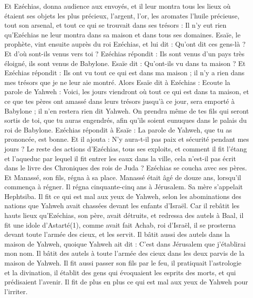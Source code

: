 \begin{multicols}{2}
Et Ezéchias, donna audience aux envoyés, et il leur montra tous les lieux où étaient ses objets les plus précieux, l’argent, l’or, les aromates l’huile précieuse, tout son arsenal, et tout ce qui se trouvait dans ses trésors : Il n’y eut rien qu’Ezéchias ne leur montra dans sa maison et dans tous ses domaines.
Esaïe, le prophète, vint ensuite auprès du roi Ezéchias, et lui dit : Qu’ont dit ces gens-là ? Et d’où sont-ils venus vers toi ? Ezéchias répondit : Ils sont venus d’un pays très éloigné, ils sont venus de Babylone.
Esaïe dit : Qu’ont-ils vu dans ta maison ? Et Ezéchias répondit : Ils ont vu tout ce qui est dans ma maison ; il n’y a rien dans mes trésors que je ne leur aie montré.
Alors Esaïe dit à Ezéchias : Ecoute la parole de Yahweh :
Voici, les jours viendront où tout ce qui est dans ta maison, et ce que tes pères ont amassé dans leurs trésors jusqu’à ce jour, sera emporté à Babylone ; il n’en restera rien dit Yahweh\FTNT{}.
On prendra même de tes fils\FTNT{} qui seront sortis de toi, que tu auras engendrés, afin qu’ils soient eunuques dans le palais du roi de Babylone.
Ezéchias répondit à Esaïe : La parole de Yahweh, que tu as prononcée, est bonne. Et il ajouta : N’y aura-t-il pas paix et sécurité pendant mes jours ?
Le reste des actions d’Ezéchias, tous ses exploits, et comment il fit l’étang et l’aqueduc par lequel il fit entrer les eaux dans la ville, cela n’est-il pas écrit dans le livre des Chroniques des rois de Juda ?
Ezéchias se coucha avec ses pères. Et Manassé, son fils, régna à sa place.
\VerseOne{}Manassé était âgé de douze ans, lorsqu’il commença à régner. Il régna cinquante-cinq ans à Jérusalem. Sa mère s’appelait Hephtsiba.
Il fit ce qui est mal aux yeux de Yahweh, selon les abominations des nations que Yahweh avait chassées devant les enfants d’Israël.
Car il rebâtit les hauts lieux qu’Ezéchias, son père, avait détruits, et redressa des autels à Baal, il fit une idole d’Astarté(1), comme avait fait Achab, roi d’Israël, il se prosterna devant toute l’armée des cieux, et les servit.
Il bâtit aussi des autels dans la maison de Yahweh, quoique Yahweh ait dit : C’est dans Jérusalem que j’établirai mon nom.
Il bâtit des autels à toute l’armée des cieux dans les deux parvis de la maison de Yahweh.
Il fit aussi passer son fils par le feu, il pratiquait l’astrologie et la divination, il établit des gens qui évoquaient les esprits des morts, et qui prédisaient l’avenir. Il fit de plus en plus ce qui est mal aux yeux de Yahweh pour l’irriter.

\end{multicols}
